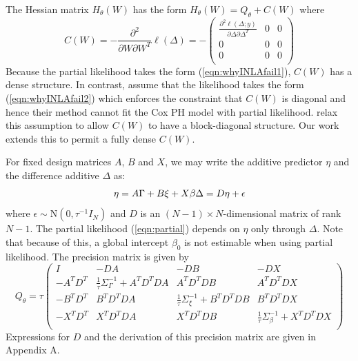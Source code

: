 \documentclass[ba]{imsart}
\begin{document}
The Hessian matrix $H_{\theta}(W)$ has the form $H_{\theta}(W) = Q_{\theta} + C(W)$ where
\begin{equation*}
C(W) = -\frac{\partial^{2}}{\partial W\partial W^{T}}\ell(\Delta) = -\begin{pmatrix}
\frac{\partial^{2}\ell(\Delta;y)}{\partial\Delta\partial\Delta^{T}} & 0 & 0 \\
0 & 0 & 0 \\
0 & 0 & 0 \\
\end{pmatrix}
\end{equation*}
Because the partial likelihood takes the form (\ref{eqn:whyINLAfail1}), $C(W)$ has a dense structure. In contrast, \cite{inla} assume that the likelihood takes the form (\ref{eqn:whyINLAfail2}) which enforces the constraint that $C(W)$ is diagonal and hence their method cannot fit the Cox PH model with partial likelihood. \cite{casecross} relax this assumption to allow $C(W)$ to have a block-diagonal structure. Our work extends this to permit a fully dense $C(W)$. 

For fixed design matrices $A$, $B$ and $X$, we may write the additive predictor $\eta$ and the difference additive $\Delta$ as:
\begin{equation}
\eta = A\Gamma + B\xi + X\beta \\
\Delta = D\eta +  \epsilon
\end{equation}
where $\epsilon \sim \text{N}\left( 0,\tau^{-1}I_{N}\right)$ and $D$ is an $(N -1) \times N $-dimensional matrix of rank $N -1$. The partial likelihood (\ref{eqn:partial}) depends on $\eta$ only through $\Delta$. Note that because of this, a global intercept $\beta_{0}$ is not estimable when using partial likelihood. The precision matrix is given by
\begin{equation}\label{eqn:precmat}
Q_{\theta} = \tau\begin{pmatrix}
I & -DA & -DB & - DX \\
- A^{T}D^{T} & \frac{1}{\tau}\Sigma_{\Gamma}^{-1} +  A^{T}D^{T}DA &  A^{T}D^{T}DB &  A^{T}D^{T}DX \\
- B^{T}D^{T} &  B^{T}D^{T}DA & \frac{1}{\tau}\Sigma_{\xi}^{-1} +  B^{T}D^{T}DB & B^{T}D^{T}DX \\
- X^{T}D^{T} &  X^{T}D^{T}DA & X^{T}D^{T}DB & \frac{1}{\tau}\Sigma_{\beta}^{-1} +  X^{T}D^{T}DX \\
\end{pmatrix}
\end{equation}
Expressions for $D$ and the derivation of this precision matrix are given in Appendix A.
\end{document}
